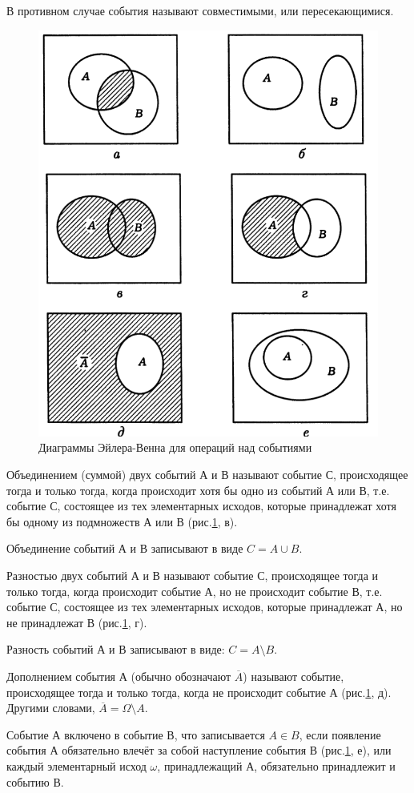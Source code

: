 \documentclass{book}
\begin{document}
В противном случае события называют совместимыми, или пересекающимися.

\begin{figure}[h!]
  \centering
  \includegraphics[width=.7\textwidth]{./pictures/2.png}
  \caption{Диаграммы Эйлера-Венна для операций над событиями}
  \label{fig:2}
\end{figure}

Объединением (суммой) двух событий А и В называют событие С, происходящее тогда и только тогда, когда происходит хотя бы одно из событий А или В, т.е. событие С, состоящее из тех элементарных исходов, которые принадлежат хотя бы одному из подмножеств А или В (рис.\ref{fig:2}, в).

Объединение событий А и В записывают в виде $C=A\cup B$.

Разностью двух событий А и В называют событие С, происходящее тогда и только тогда, когда происходит событие А, но не происходит событие В, т.е. событие С, состоящее из тех элементарных исходов, которые принадлежат А, но не принадлежат В (рис.\ref{fig:2}, г).

Разность событий А и В записывают в виде: $C=A\setminus B$.

Дополнением события А (обычно обозначают $\overline{A}$) называют событие, происходящее тогда и только тогда, когда не происходит событие А (рис.\ref{fig:2}, д). Другими словами, $\overline{A}=\Omega\setminus A$.

Событие А включено в событие В, что записывается $A\in B$, если появление события А обязательно влечёт за собой наступление события В (рис.\ref{fig:2}, е), или каждый элементарный исход $\omega$, принадлежащий А, обязательно принадлежит и событию В.
\end{document}
